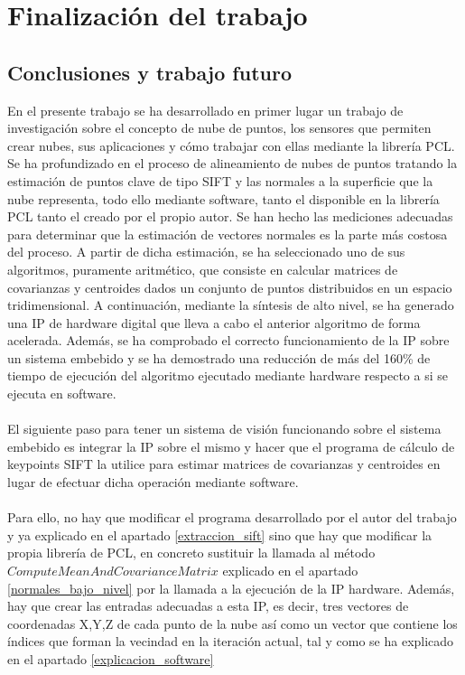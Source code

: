 \chapter{Finalización del trabajo}
\section{Conclusiones y trabajo futuro}
En el presente trabajo se ha desarrollado en primer lugar un trabajo de investigación sobre el concepto de nube de puntos, los sensores que permiten crear nubes, sus aplicaciones y cómo trabajar con ellas mediante la librería PCL. Se ha profundizado en el proceso de alineamiento de nubes de puntos tratando la estimación de puntos clave de tipo SIFT y las normales a la superficie que la nube representa, todo ello mediante software, tanto el disponible en la librería PCL tanto el creado por el propio autor. Se han hecho las mediciones adecuadas para determinar que la estimación de vectores normales es la parte más costosa del proceso. A partir de dicha estimación, se ha seleccionado uno de sus algoritmos, puramente aritmético, que consiste en calcular matrices de covarianzas y centroides dados un conjunto de puntos distribuidos en un espacio tridimensional. A continuación, mediante la síntesis de alto nivel, se ha generado una IP de hardware digital que lleva a cabo el anterior algoritmo de forma acelerada. Además, se ha comprobado el correcto funcionamiento de la IP sobre un sistema embebido y se ha demostrado una reducción de más del 160\% de tiempo de ejecución del algoritmo ejecutado mediante hardware respecto a si se ejecuta en software.
\\
\\
El siguiente paso para tener un sistema de visión funcionando sobre el sistema embebido es integrar la IP sobre el mismo y hacer que el programa de cálculo de keypoints SIFT la utilice para estimar matrices de covarianzas y centroides en lugar de efectuar dicha operación mediante software.
\\
\\
Para ello, no hay que modificar el programa desarrollado por el autor del trabajo y ya explicado en el apartado \ref{extraccion_sift} sino que hay que modificar la propia librería de PCL, en concreto sustituir la llamada al método $ComputeMeanAndCovarianceMatrix$ explicado en el apartado \ref{normales_bajo_nivel} por la llamada a la ejecución de la IP hardware. Además, hay que crear las entradas adecuadas a esta IP, es decir, tres vectores de coordenadas X,Y,Z de cada punto de la nube así como un vector que contiene los índices que forman la vecindad en la iteración actual, tal y como se ha explicado en el apartado \ref{explicacion_software}
